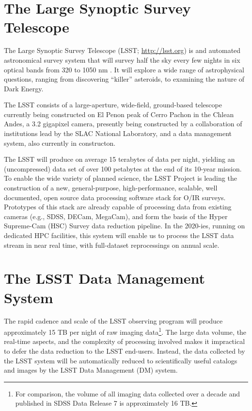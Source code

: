\documentclass[11pt,twoside]{article}
\begin{document}
\section{ The Large Synoptic Survey Telescope }

The Large Synoptic Survey Telescope (LSST; \url{http://lsst.org}) is and
automated astronomical survey system that will survey half the
sky every few nights in six optical bands from 320 to 1050 nm \citep{OP}. It
will explore a wide range of astrophysical questions, ranging from discovering
``killer'' asteroids, to examining the nature of Dark Energy.

The LSST consists of a large-aperture, wide-field, ground-based telescope
currently being constructed on El Penon peak of Cerro Pachon in the Chlean
Andes, a 3.2 gigapixel camera, presently being constructed by a collaboration
of institutions lead by the SLAC National Laboratory, and a data management
system, also currently in constructon.

The LSST will produce on average 15 terabytes of data per night, yielding an
(uncompressed) data set of over 100 petabytes at the end of its 10-year
mission.  To enable the wide variety of planned science, the LSST Project is
leading the construction of a new, general-purpose, high-performance,
scalable, well documented, open source data processing software stack for
O/IR surveys.  Prototypes of this stack are already capable of processing
data from existing cameras (e.g., SDSS, DECam, MegaCam), and form the basis
of the Hyper Supreme-Cam (HSC) Survey data reduction pipeline.  In the
2020-ies, running on dedicated HPC facilities, this system will enable us to
process the LSST data stream in near real time, with full-dataset
reprocessings on annual scale.

\section{ The LSST Data Management System }
\label{sec:dm}

The rapid cadence and scale of the LSST observing program will produce
approximately 15 TB per night of raw imaging data\footnote{For
  comparison, the volume of all imaging data collected over a decade
  and published in SDSS Data Release 7 \citep{DR7} is approximately 16 TB.}. The large data volume, the real-time aspects, and the complexity of processing involved makes it impractical to defer the data reduction to the LSST end-users. Instead, the data collected by the LSST system will be automatically reduced to scientifically useful catalogs and images by the LSST Data Management (DM) system.
\\
\end{document}
